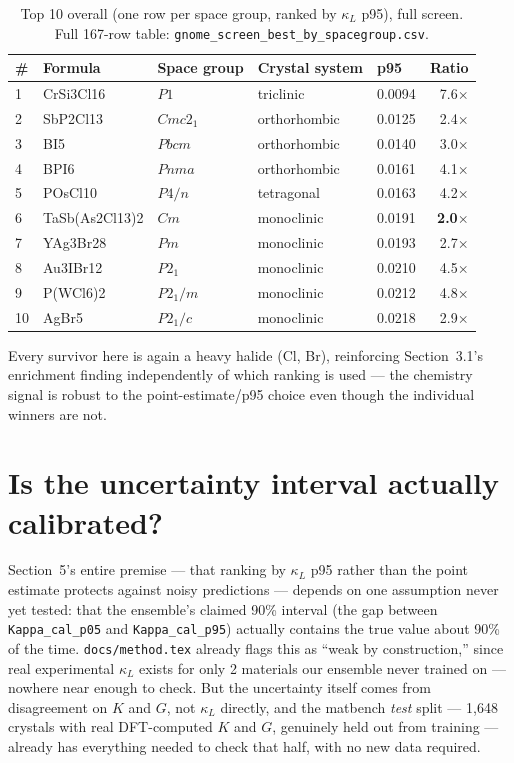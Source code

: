 \documentclass[11pt,a4paper]{article}
\newcommand{\KL}{$\kappa_L$}
\begin{document}
\begin{table}[H]
\centering
\caption{Top 10 overall (one row per space group, ranked by \KL{} p95), full
screen. Full 167-row table: \texttt{gnome\_screen\_best\_by\_spacegroup.csv}.}
\begin{tabular}{lllll r}
\toprule
\# & Formula & Space group & Crystal system & p95 & Ratio \\
\midrule
1  & CrSi3Cl16       & $P1$       & triclinic    & 0.0094 & 7.6$\times$ \\
2  & SbP2Cl13        & $Cmc2_1$   & orthorhombic & 0.0125 & 2.4$\times$ \\
3  & BI5             & $Pbcm$     & orthorhombic & 0.0140 & 3.0$\times$ \\
4  & BPI6            & $Pnma$     & orthorhombic & 0.0161 & 4.1$\times$ \\
5  & POsCl10         & $P4/n$     & tetragonal   & 0.0163 & 4.2$\times$ \\
6  & TaSb(As2Cl13)2  & $Cm$       & monoclinic   & 0.0191 & \textbf{2.0$\times$} \\
7  & YAg3Br28        & $Pm$       & monoclinic   & 0.0193 & 2.7$\times$ \\
8  & Au3IBr12        & $P2_1$     & monoclinic   & 0.0210 & 4.5$\times$ \\
9  & P(WCl6)2        & $P2_1/m$   & monoclinic   & 0.0212 & 4.8$\times$ \\
10 & AgBr5           & $P2_1/c$   & monoclinic   & 0.0218 & 2.9$\times$ \\
\bottomrule
\end{tabular}
\end{table}

\noindent
Every survivor here is again a heavy halide (Cl, Br), reinforcing
Section~3.1's enrichment finding independently of which ranking is used ---
the chemistry signal is robust to the point-estimate/p95 choice even though
the individual winners are not.

\clearpage
\section{Is the uncertainty interval actually calibrated?}

Section~5's entire premise --- that ranking by \KL{} p95 rather than the
point estimate protects against noisy predictions --- depends on one
assumption never yet tested: that the ensemble's claimed 90\% interval
(the gap between \texttt{Kappa\_cal\_p05} and \texttt{Kappa\_cal\_p95})
actually contains the true value about 90\% of the time.
\texttt{docs/method.tex} already flags this as ``weak by construction,''
since real experimental \KL{} exists for only 2 materials our ensemble
never trained on --- nowhere near enough to check. But the uncertainty
itself comes from disagreement on $K$ and $G$, not \KL{} directly, and the
matbench \emph{test} split --- 1{,}648 crystals with real DFT-computed $K$
and $G$, genuinely held out from training --- already has everything needed
to check that half, with no new data required.
\end{document}
